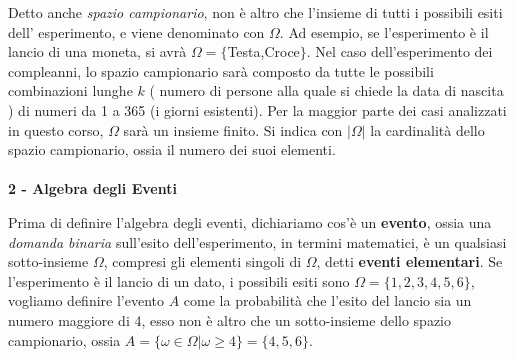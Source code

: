 \documentclass[12pt, letterpaper]{article}
\begin{document}
Detto anche \textit{spazio campionario}, non è altro che l'insieme di tutti i possibili esiti dell'
esperimento, e viene denominato con \(\Omega\). Ad esempio, se l'esperimento è il lancio di una moneta,
si avrà \(\Omega=\{\)Testa,Croce\(\}\). Nel caso dell'esperimento dei compleanni, lo spazio campionario 
sarà composto da tutte le possibili combinazioni lunghe \(k\) ( numero di persone alla quale si chiede 
la data di nascita ) di numeri da 1 a 365 (i giorni esistenti). Per la maggior parte dei casi analizzati 
in questo corso, \(\Omega\) sarà un insieme finito. Si indica con \(|\Omega|\) la cardinalità dello 
spazio campionario, ossia il numero dei suoi elementi.
\\\hphantom{.}\\\textbf{2 - Algebra degli Eventi}

Prima di definire l'algebra degli eventi, dichiariamo cos'è un \textbf{evento}, ossia una \textit{domanda
binaria} sull'esito dell'esperimento, in termini matematici, è un qualsiasi sotto-insieme \(\Omega\), compresi
gli elementi singoli di \(\Omega\), detti \textbf{eventi elementari}. Se l'esperimento è il lancio di un dato,
i possibili esiti sono \(\Omega=\{1,2,3,4,5,6\}\), vogliamo definire l'evento \(A\) come la probabilità
che l'esito del lancio sia un numero maggiore di 4, esso non è altro che un sotto-insieme dello spazio campionario,
ossia \(A=\{\omega \in \Omega | \omega \ge 4 \}=\{4,5,6\}\). 
\end{document}

